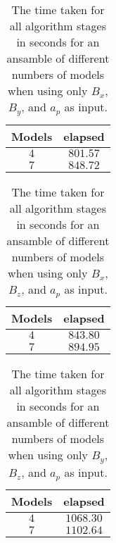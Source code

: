 \begin{table}[!ht]
	\centering
	\begin{tabular}{|c|c|}
		\hline
		Models & elapsed \\ \hline
		$4$ & $801.57$ \\ \hline
		$7$ & $848.72$ \\ \hline
	\end{tabular}
	\caption{The time taken for all algorithm stages in seconds for an ansamble of different numbers of models when using only $B_{x}$, $B_{y}$, and $a_{p}$ as input.}
	\label{tab:time:ansamble:xyap}
\end{table}

\begin{table}[!ht]
	\centering
	\begin{tabular}{|c|c|}
		\hline
		Models & elapsed \\ \hline
		$4$ & $843.80$ \\ \hline
		$7$ & $894.95$ \\ \hline
	\end{tabular}
	\caption{The time taken for all algorithm stages in seconds for an ansamble of different numbers of models when using only $B_{x}$, $B_{z}$, and $a_{p}$ as input.}
	\label{tab:time:ansamble:xzap}
\end{table}

\begin{table}[!ht]
	\centering
	\begin{tabular}{|c|c|}
		\hline
		Models & elapsed \\ \hline
		$4$ & $1068.30$ \\ \hline
		$7$ & $1102.64$ \\ \hline
	\end{tabular}
	\caption{The time taken for all algorithm stages in seconds for an ansamble of different numbers of models when using only $B_{y}$, $B_{z}$, and $a_{p}$ as input.}
	\label{tab:time:ansamble:yzap}
\end{table}
